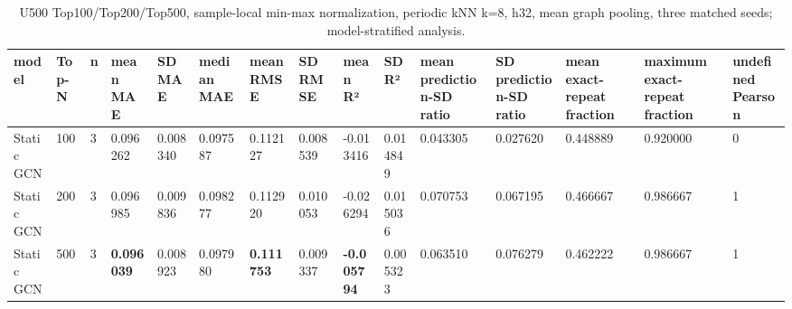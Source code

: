 \begin{table}
\centering
\small
\caption{U500 Top100/Top200/Top500, sample-local min-max normalization, periodic kNN k=8, h32, mean graph pooling, three matched seeds; model-stratified analysis.}
\begin{tabular}{lllllllllllllll}
\hline
model & Top-N & n & mean MAE & SD MAE & median MAE & mean RMSE & SD RMSE & mean R² & SD R² & mean prediction-SD ratio & SD prediction-SD ratio & mean exact-repeat fraction & maximum exact-repeat fraction & undefined Pearson \\
\hline
Static GCN & 100 & 3 & 0.096262 & 0.008340 & 0.097587 & 0.112127 & 0.008539 & -0.013416 & 0.014849 & 0.043305 & 0.027620 & 0.448889 & 0.920000 & 0 \\
Static GCN & 200 & 3 & 0.096985 & 0.009836 & 0.098277 & 0.112920 & 0.010053 & -0.026294 & 0.015036 & 0.070753 & 0.067195 & 0.466667 & 0.986667 & 1 \\
Static GCN & 500 & 3 & \textbf{0.096039} & 0.008923 & 0.097980 & \textbf{0.111753} & 0.009337 & \textbf{-0.005794} & 0.005323 & 0.063510 & 0.076279 & 0.462222 & 0.986667 & 1 \\
\hline
\end{tabular}
\end{table}
